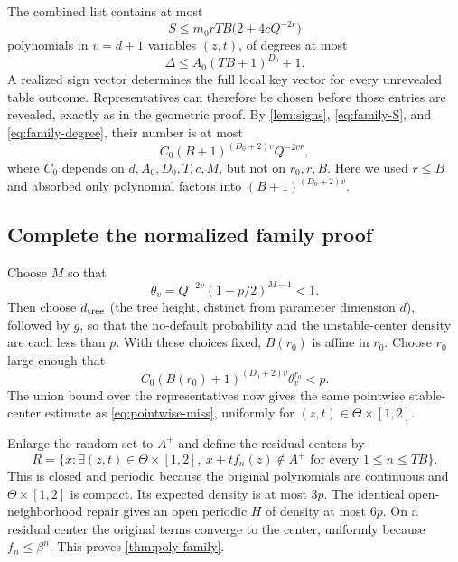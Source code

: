 The combined list contains at most
\begin{equation}\label{eq:family-S}
 S\le m_0rTB\bigl(2+4cQ^{-2r}\bigr)
\end{equation}
polynomials in $v=d+1$ variables $(z,t)$, of degrees at most
\begin{equation}\label{eq:family-degree}
 \Delta\le A_0(TB+1)^{D_0}+1.
\end{equation}
A realized sign vector determines the full local key vector for every
unrevealed table outcome. Representatives can therefore be chosen
before those entries are revealed, exactly as in the geometric proof.
By \cref{lem:signs}, \eqref{eq:family-S}, and
\eqref{eq:family-degree}, their number is at most
\begin{equation}\label{eq:family-complexity}
 C_0(B+1)^{(D_0+2)v}Q^{-2vr},
\end{equation}
where $C_0$ depends on $d,A_0,D_0,T,c,M$, but not on $r_0,r,B$.
Here we used $r\le B$ and absorbed only polynomial factors into
$(B+1)^{(D_0+2)v}$.

\subsection{Complete the normalized family proof}

Choose $M$ so that
\begin{equation}\label{eq:family-theta}
 \theta_v=Q^{-2v}(1-p/2)^{M-1}<1.
\end{equation}
Then choose $d_{\rm tree}$ (the tree height, distinct from parameter
dimension $d$), followed by $g$, so that the no-default probability
and the unstable-center density are each less than $p$.
With these choices fixed, $B(r_0)$ is affine in $r_0$.
Choose $r_0$ large enough that
\[
 C_0(B(r_0)+1)^{(D_0+2)v}\theta_v^{r_0}<p.
\]
The union bound over the representatives now gives the same pointwise
stable-center estimate as \eqref{eq:pointwise-miss}, uniformly for
$(z,t)\in\Theta\times[1,2]$.

Enlarge the random set to $A^+$ and define the residual centers by
\[
 R=\{x:\exists(z,t)\in\Theta\times[1,2],\ 
       x+tf_n(z)\notin A^+\text{ for every }1\le n\le TB\}.
\]
This is closed and periodic because the original polynomials are
continuous and $\Theta\times[1,2]$ is compact. Its expected density
is at most $3p$. The identical open-neighborhood repair gives an open
periodic $H$ of density at most $6p$. On a residual center the original
terms converge to the center, uniformly because $f_n\le\beta^n$.
This proves \cref{thm:poly-family}.

